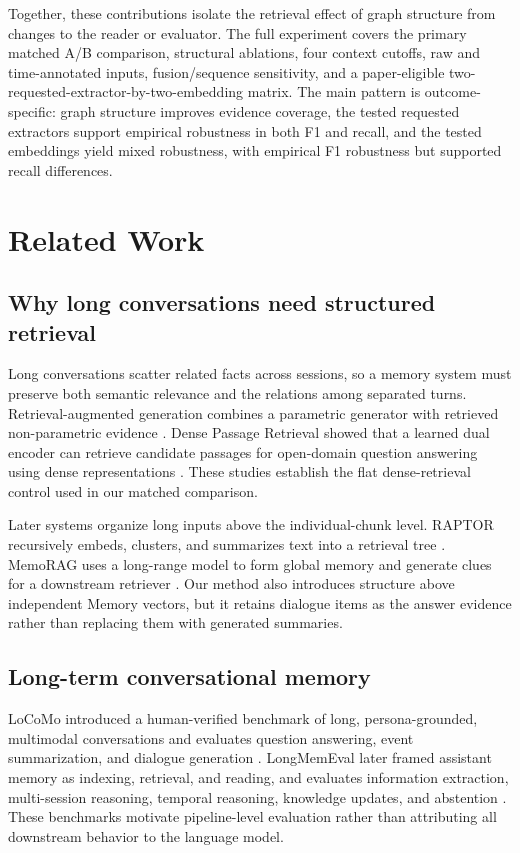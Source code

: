 \documentclass[10pt,twocolumn]{article}
\begin{document}
Together, these contributions isolate the retrieval effect of graph structure
from changes to the reader or evaluator. The full experiment covers the
primary matched A/B comparison, structural ablations, four context cutoffs,
raw and time-annotated inputs, fusion/sequence sensitivity, and a
paper-eligible two-requested-extractor-by-two-embedding matrix. The main
pattern is outcome-specific: graph structure improves evidence coverage, the
tested requested extractors support empirical robustness in both F1 and
recall, and the tested embeddings yield mixed robustness, with empirical F1
robustness but supported recall differences.

\section{Related Work}

\subsection{Why long conversations need structured retrieval}

Long conversations scatter related facts across sessions, so a memory system
must preserve both semantic relevance and the relations among separated
turns. Retrieval-augmented generation combines a parametric generator with retrieved
non-parametric evidence \citep{lewis2020rag}. Dense Passage Retrieval showed
that a learned dual encoder can retrieve candidate passages for open-domain
question answering using dense representations
\citep{karpukhin2020dpr}. These studies establish the flat dense-retrieval
control used in our matched comparison.

Later systems organize long inputs above the individual-chunk level. RAPTOR
recursively embeds, clusters, and summarizes text into a retrieval tree
\citep{sarthi2024raptor}. MemoRAG uses a long-range model to form global memory
and generate clues for a downstream retriever \citep{qian2024memorag}. Our
method also introduces structure above independent Memory vectors, but it
retains dialogue items as the answer evidence rather than replacing them with
generated summaries.

\subsection{Long-term conversational memory}

LoCoMo introduced a human-verified benchmark of long, persona-grounded,
multimodal conversations and evaluates question answering, event
summarization, and dialogue generation \citep{maharana2024locomo}.
LongMemEval later framed assistant memory as indexing, retrieval, and reading,
and evaluates information extraction, multi-session reasoning, temporal
reasoning, knowledge updates, and abstention \citep{wu2025longmemeval}. These
benchmarks motivate pipeline-level evaluation rather than attributing all
downstream behavior to the language model.
\end{document}
